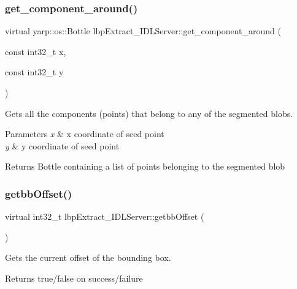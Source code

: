 \subsubsection{\texorpdfstring{get\+\_\+component\+\_\+around()}{get\_component\_around()}}
{\footnotesize\ttfamily virtual yarp\+::os\+::\+Bottle lbp\+Extract\+\_\+\+I\+D\+L\+Server\+::get\+\_\+component\+\_\+around (\begin{DoxyParamCaption}\item[{const int32\+\_\+t}]{x,  }\item[{const int32\+\_\+t}]{y }\end{DoxyParamCaption})\hspace{0.3cm}{\ttfamily [virtual]}}



Gets all the components (points) that belong to any of the segmented blobs. 


\begin{DoxyParams}{Parameters}
{\em x} & x coordinate of seed point \\
\hline
{\em y} & y coordinate of seed point \\
\hline
\end{DoxyParams}
\begin{DoxyReturn}{Returns}
Bottle containing a list of points belonging to the segmented blob 
\end{DoxyReturn}
\mbox{\label{classlbpExtract__IDLServer_a2260626a2137fc9ffe9364fad3444024}} 
\subsubsection{\texorpdfstring{getbb\+Offset()}{getbbOffset()}}
{\footnotesize\ttfamily virtual int32\+\_\+t lbp\+Extract\+\_\+\+I\+D\+L\+Server\+::getbb\+Offset (\begin{DoxyParamCaption}{ }\end{DoxyParamCaption})\hspace{0.3cm}{\ttfamily [virtual]}}



Gets the current offset of the bounding box. 

\begin{DoxyReturn}{Returns}
true/false on success/failure 
\end{DoxyReturn}
\mbox{\label{classlbpExtract__IDLServer_ae6f220a2b984c7211bd59beca4db0373}} 
